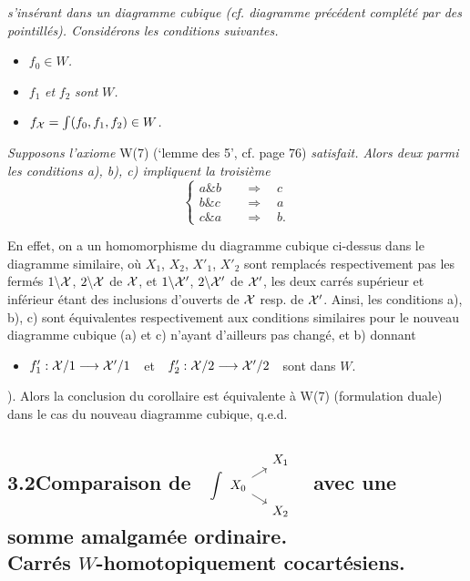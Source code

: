 \textit{s'insérant dans un diagramme cubique (cf. diagramme précédent complété par des pointillés). Considérons les conditions suivantes.}

\begin{itemize}
\item[\textit{a)}] $f_0\in W$\textit{.}
\item[\textit{b)}] $f_1$ \textit{et} $f_2$ \textit{sont} $W$\textit{.}
\item[\textit{c)}] $f_{\mathcal{X}} = \int(f_0, f_1, f_2)\in W$\textit{.}
\end{itemize}

\textit{Supposons l'axiome} W(7) (`lemme des 5', cf. page 76) \textit{satisfait. Alors deux parmi les conditions a), b), c) impliquent la troisième}
\[
\left\{
\begin{aligned}
a \mathbin{\&} b &\quad\Longrightarrow\quad c\\
b \mathbin{\&} c &\quad\Longrightarrow\quad a\\
c \mathbin{\&} a &\quad\Longrightarrow\quad b.
\end{aligned}
\right.
\]

En effet, on a un homomorphisme du diagramme cubique ci-dessus dans le diagramme similaire, où $X_1$, $X_2$, $X'_1$, $X'_2$ sont remplacés respectivement pas les fermés %
$1\backslash\mathcal{X}$, $2\backslash\mathcal{X}$ de $\mathcal{X}$, et $1\backslash\mathcal{X}'$, $2\backslash\mathcal{X}'$ de $\mathcal{X}'$, les deux carrés supérieur et inférieur étant des inclusions d'ouverts de $\mathcal{X}$ resp. de $\mathcal{X}'$. Ainsi, les conditions a), b), c) sont équivalentes respectivement aux conditions similaires pour le nouveau diagramme cubique
(a) et c) n'ayant d'ailleurs pas changé, et b) donnant
\begin{itemize}
\item[b$'$)] $f'_1 : \mathcal{X}/1 \longrightarrow \mathcal{X}'/1$\ \ et\ \ $f'_2 : \mathcal{X}/2 \longrightarrow \mathcal{X}'/2$\ \ sont dans $W$.
\end{itemize}
). Alors la conclusion du corollaire est équivalente à W(7) (formulation duale) dans le cas du nouveau diagramme cubique, q.e.d.

\subsection*{3.2\quad Comparaison de \ $\displaystyle\int
\begin{tikzcd}[column sep=small, row sep=tiny, ampersand replacement=\&, baseline=(\tikzcdmatrixname-2-1.base)]
 \& X_1 \\
X_0 \arrow[ur] \arrow[dr] \& \\
 \& X_2
\end{tikzcd}$ \ avec une somme amalgamée ordinaire.\\
Carrés $W$-homotopiquement cocartésiens.}

